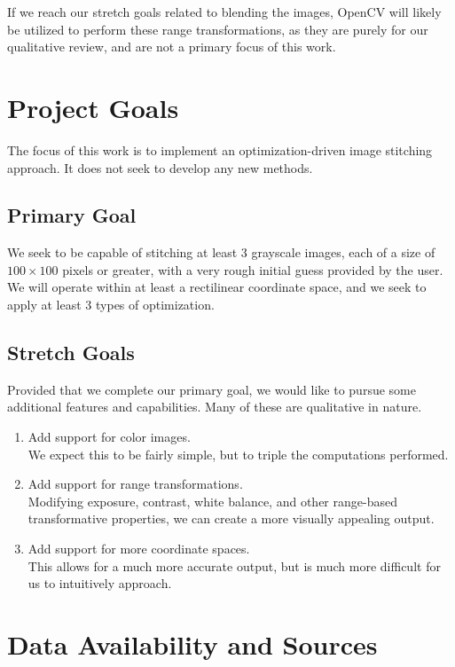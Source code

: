 \documentclass[11pt, letterpaper, notitlepage]{article}
\begin{document}
\begin{multicols}{2}
If we reach our stretch goals related to blending the images, OpenCV will likely be utilized to perform these range transformations, as they are purely for our qualitative review, and are not a primary focus of this work.

\section{Project Goals}
The focus of this work is to implement an optimization-driven image stitching approach. It does not seek to develop any new methods.

\subsection*{Primary Goal}
We seek to be capable of stitching at least 3 grayscale images, each of a size of $100\times100$ pixels or greater, with a very rough initial guess provided by the user. We will operate within at least a rectilinear coordinate space, and we seek to apply at least 3 types of optimization.

\subsection*{Stretch Goals}
Provided that we complete our primary goal, we would like to pursue some additional features and capabilities. Many of these are qualitative in nature.

\begin{enumerate}
  \item Add support for color images.\\
        We expect this to be fairly simple, but to triple the computations performed.
  \item Add support for range transformations.\\
        Modifying exposure, contrast, white balance, and other range-based transformative properties, we can create a more visually appealing output.
  \item Add support for more coordinate spaces.\\
        This allows for a much more accurate output, but is much more difficult for us to intuitively approach.
\end{enumerate}



\section{Data Availability and Sources}


\end{multicols}
\end{document}
